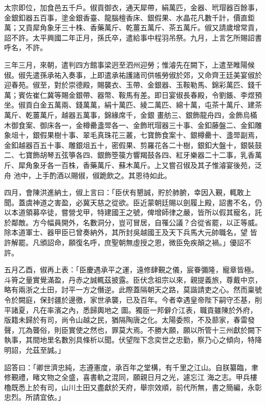 \begin{pinyinscope}
 太宗即位，加食邑五千戶。俶貢御衣，通天犀帶，絹萬匹，金器、玳瑁器百餘事，金銀釦器五百事，塗金銀香臺、龍腦檀香床、銀假果、水晶花凡數千計，價直鉅萬；又貢犀角象牙三十株、香藥萬斤、乾薑五萬斤、茶五萬斤。俶又請歲增常貢，詔不許。太平興國二年正月，孫氏卒，遣給事中程羽吊祭。九月，上言乞所賜詔書呼名，不許。



 三年三月，來朝，遣判四方館事梁迥至泗州迎勞；惟濬先在闕下，上遣至睢陽候俶。俶先遣孫承祐入奏事，上即遣承祐護諸司供帳勞俶於郊，又命齊王廷美宴俶於迎春苑。俶至，對於崇德殿，賜襲衣、玉帶、金銀器、玉鞍勒馬、錦彩萬匹、錢千萬；賓佐崔仁冀等賜金銀帶、器幣、鞍馬有差。即日宴俶長春殿，令劉鋹、李煜預坐。俶貢白金五萬兩、錢萬萬，絹十萬匹、綾二萬匹、綿十萬，屯茶十萬斤、建茶萬斤、乾薑萬斤，越器五萬事，錦緣席千，金銀
 畫舫三、銀飾龍舟四，金飾烏樠木御食案、御床各一，金樽罍盞斝各一、金飾玳瑁器三十事、金釦藤盤二、金釦雕象俎十，銀假果樹十事、翠毛真珠花三叢，七寶飾食案十、銀樽罍十、盞斝副焉，金釦越器百五十事、雕銀俎五十，密假果、剪羅花各二十樹，銀釦大盤十，銀裝鼓二、七寶飾胡琴五弦箏各四、銀飾箜篌方響羯鼓各四、紅牙樂器二十二事，乳香萬斤、犀角象牙各一百株，香藥萬斤、蘇木萬斤。上又嘗召俶及其子惟濬宴後苑，泛舟
 池中，上手酌酒以賜俶，俶跪飲之。其恩待如此。



 四月，會陳洪進納土，俶上言曰：「臣伏有懇誠，貯於肺腑，幸因入覲，輒敢上聞。蓋虞神道之害盈，必冀天慈之從欲。臣近蒙朝廷賜以劍履上殿，詔書不名，仍以本道領募卒徒，嘗營戈甲，特建國王之號，俾增師律之嚴，皆所以假其寵名，託於鄰敵。方今幅員開外，名數洞分，豈可冒居，自罹公議？合從省罷，以正等威。除本道軍士、器甲臣已曾奏納外，其所封吳越國王及天下兵馬大元帥職名，望
 皆許解罷。凡頒詔命，願復名呼，庶聖朝無虛授之恩，微臣免疾顛之禍。」優詔不許。



 五月乙酉，俶再上表：「臣慶遇承平之運，遠修肆覲之儀，宸眷彌隆，寵章皆極。斗筲之量實覺滿盈，丹赤之誠輒茲披露。臣伏念祖宗以來，親提義旅，尊戴中京，略有兩浙之土田，討平一方之僭逆。此際蓋隔朝天之路，莫諧請吏之心。然而稟號令於闕庭，保封疆於邊徼，家世承襲，已及百年。今者幸遇皇帝陛下嗣守丕基，削平諸夏，凡在率濱之內，悉歸輿地之
 圖。獨臣一邦僻介江表，職貢雖陳於外府，版籍未歸於有司，尚令山越之民，猶隔陶唐之化。太陽委照，不及蔀家，春雷發聲，兀為聾俗，則臣實使之然也，罪莫大焉。不勝大願，願以所管十三州獻於闕下執事，其間地里名數別具條析以聞。伏望陛下念奕世之忠勤，察乃心之傾向，特降明詔，允茲至誠。」



 詔答曰：「卿世濟忠純，志遵憲度，承百年之堂構，有千里之江山。自朕纂臨，聿修覲禮，睹文物之全盛，喜書軌之混同，願親日月之光，遽忘江
 海之志。甲兵樓櫓既悉上於有司，山川土田又盡獻於天府，舉宗效順，前代所無，書之簡編，永彰忠烈。所請宜依。」




\end{pinyinscope}
